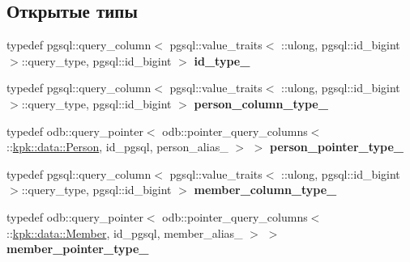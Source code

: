 \subsection*{Открытые типы}
\begin{DoxyCompactItemize}
\item 
typedef pgsql\+::query\+\_\+column$<$ pgsql\+::value\+\_\+traits$<$ \+::ulong, pgsql\+::id\+\_\+bigint $>$\+::query\+\_\+type, pgsql\+::id\+\_\+bigint $>$ {\bfseries id\+\_\+type\+\_\+}\hypertarget{structodb_1_1query__columns_3_01_1_1kpk_1_1data_1_1_loan_oper_00_01id__pgsql_00_01_a_01_4_a2ab96abc76b7ad411cd90fccf6f9d976}{}\label{structodb_1_1query__columns_3_01_1_1kpk_1_1data_1_1_loan_oper_00_01id__pgsql_00_01_a_01_4_a2ab96abc76b7ad411cd90fccf6f9d976}

\item 
typedef pgsql\+::query\+\_\+column$<$ pgsql\+::value\+\_\+traits$<$ \+::ulong, pgsql\+::id\+\_\+bigint $>$\+::query\+\_\+type, pgsql\+::id\+\_\+bigint $>$ {\bfseries person\+\_\+column\+\_\+type\+\_\+}\hypertarget{structodb_1_1query__columns_3_01_1_1kpk_1_1data_1_1_loan_oper_00_01id__pgsql_00_01_a_01_4_a3f88a1b0f9d46bd21c530cf49e3a692c}{}\label{structodb_1_1query__columns_3_01_1_1kpk_1_1data_1_1_loan_oper_00_01id__pgsql_00_01_a_01_4_a3f88a1b0f9d46bd21c530cf49e3a692c}

\item 
typedef odb\+::query\+\_\+pointer$<$ odb\+::pointer\+\_\+query\+\_\+columns$<$ \+::\hyperlink{classkpk_1_1data_1_1_person}{kpk\+::data\+::\+Person}, id\+\_\+pgsql, person\+\_\+alias\+\_\+ $>$ $>$ {\bfseries person\+\_\+pointer\+\_\+type\+\_\+}\hypertarget{structodb_1_1query__columns_3_01_1_1kpk_1_1data_1_1_loan_oper_00_01id__pgsql_00_01_a_01_4_a3a4b959706627058a8f0fa7062a8ee77}{}\label{structodb_1_1query__columns_3_01_1_1kpk_1_1data_1_1_loan_oper_00_01id__pgsql_00_01_a_01_4_a3a4b959706627058a8f0fa7062a8ee77}

\item 
typedef pgsql\+::query\+\_\+column$<$ pgsql\+::value\+\_\+traits$<$ \+::ulong, pgsql\+::id\+\_\+bigint $>$\+::query\+\_\+type, pgsql\+::id\+\_\+bigint $>$ {\bfseries member\+\_\+column\+\_\+type\+\_\+}\hypertarget{structodb_1_1query__columns_3_01_1_1kpk_1_1data_1_1_loan_oper_00_01id__pgsql_00_01_a_01_4_ab252606bca5e8ea9d8ddef9f701a389b}{}\label{structodb_1_1query__columns_3_01_1_1kpk_1_1data_1_1_loan_oper_00_01id__pgsql_00_01_a_01_4_ab252606bca5e8ea9d8ddef9f701a389b}

\item 
typedef odb\+::query\+\_\+pointer$<$ odb\+::pointer\+\_\+query\+\_\+columns$<$ \+::\hyperlink{classkpk_1_1data_1_1_member}{kpk\+::data\+::\+Member}, id\+\_\+pgsql, member\+\_\+alias\+\_\+ $>$ $>$ {\bfseries member\+\_\+pointer\+\_\+type\+\_\+}\hypertarget{structodb_1_1query__columns_3_01_1_1kpk_1_1data_1_1_loan_oper_00_01id__pgsql_00_01_a_01_4_ab353c72e236d47452181c4ec89175943}{}\label{structodb_1_1query__columns_3_01_1_1kpk_1_1data_1_1_loan_oper_00_01id__pgsql_00_01_a_01_4_ab353c72e236d47452181c4ec89175943}


\end{DoxyCompactItemize}
